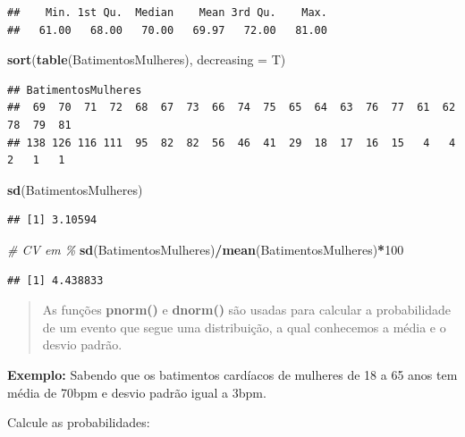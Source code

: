 \documentclass[
]{book}
\newenvironment{Shaded}{\begin{snugshade}}{\end{snugshade}}
\newcommand{\AttributeTok}[1]{\textcolor[rgb]{0.13,0.29,0.53}{#1}}
\newcommand{\CommentTok}[1]{\textcolor[rgb]{0.56,0.35,0.01}{\textit{#1}}}
\newcommand{\DecValTok}[1]{\textcolor[rgb]{0.00,0.00,0.81}{#1}}
\newcommand{\FunctionTok}[1]{\textcolor[rgb]{0.13,0.29,0.53}{\textbf{#1}}}
\newcommand{\NormalTok}[1]{#1}
\newcommand{\SpecialCharTok}[1]{\textcolor[rgb]{0.81,0.36,0.00}{\textbf{#1}}}
\begin{document}
\begin{verbatim}
##    Min. 1st Qu.  Median    Mean 3rd Qu.    Max. 
##   61.00   68.00   70.00   69.97   72.00   81.00
\end{verbatim}

\begin{Shaded}
\begin{Highlighting}[]
\FunctionTok{sort}\NormalTok{(}\FunctionTok{table}\NormalTok{(BatimentosMulheres), }\AttributeTok{decreasing =}\NormalTok{ T)}
\end{Highlighting}
\end{Shaded}

\begin{verbatim}
## BatimentosMulheres
##  69  70  71  72  68  67  73  66  74  75  65  64  63  76  77  61  62  78  79  81 
## 138 126 116 111  95  82  82  56  46  41  29  18  17  16  15   4   4   2   1   1
\end{verbatim}

\begin{Shaded}
\begin{Highlighting}[]
\FunctionTok{sd}\NormalTok{(BatimentosMulheres)}
\end{Highlighting}
\end{Shaded}

\begin{verbatim}
## [1] 3.10594
\end{verbatim}

\begin{Shaded}
\begin{Highlighting}[]
\CommentTok{\# CV em \%}
\FunctionTok{sd}\NormalTok{(BatimentosMulheres)}\SpecialCharTok{/}\FunctionTok{mean}\NormalTok{(BatimentosMulheres)}\SpecialCharTok{*}\DecValTok{100}
\end{Highlighting}
\end{Shaded}

\begin{verbatim}
## [1] 4.438833
\end{verbatim}

\begin{quote}
As funções \textbf{pnorm()} e \textbf{dnorm()} são usadas para calcular a probabilidade de um evento que segue uma distribuição, a qual conhecemos a média e o desvio padrão.
\end{quote}

\textbf{Exemplo:} Sabendo que os batimentos cardíacos de mulheres de 18 a 65 anos tem média de 70bpm e desvio padrão igual a 3bpm.

Calcule as probabilidades:
\end{document}
